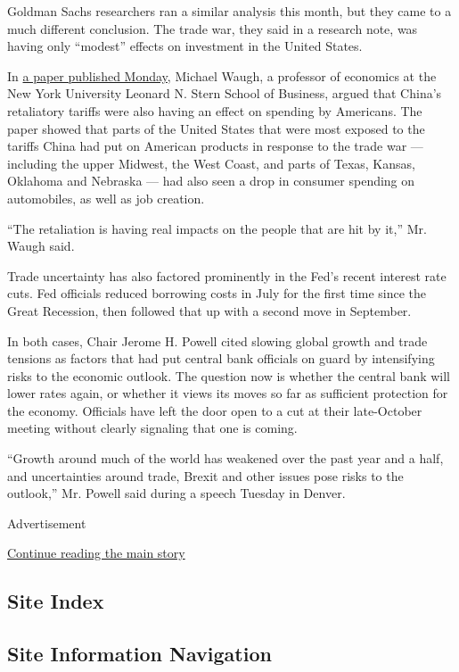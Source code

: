 Goldman Sachs researchers ran a similar analysis this month, but they
came to a much different conclusion. The trade war, they said in a
research note, was having only ``modest'' effects on investment in the
United States.

In \href{https://www.nber.org/papers/w26353}{a paper published Monday},
Michael Waugh, a professor of economics at the New York University
Leonard N. Stern School of Business, argued that China's retaliatory
tariffs were also having an effect on spending by Americans. The paper
showed that parts of the United States that were most exposed to the
tariffs China had put on American products in response to the trade war
--- including the upper Midwest, the West Coast, and parts of Texas,
Kansas, Oklahoma and Nebraska --- had also seen a drop in consumer
spending on automobiles, as well as job creation.

``The retaliation is having real impacts on the people that are hit by
it,'' Mr. Waugh said.

Trade uncertainty has also factored prominently in the Fed's recent
interest rate cuts. Fed officials reduced borrowing costs in July for
the first time since the Great Recession, then followed that up with a
second move in September.

In both cases, Chair Jerome H. Powell cited slowing global growth and
trade tensions as factors that had put central bank officials on guard
by intensifying risks to the economic outlook. The question now is
whether the central bank will lower rates again, or whether it views its
moves so far as sufficient protection for the economy. Officials have
left the door open to a cut at their late-October meeting without
clearly signaling that one is coming.

``Growth around much of the world has weakened over the past year and a
half, and uncertainties around trade, Brexit and other issues pose risks
to the outlook,'' Mr. Powell said during a speech Tuesday in Denver.

Advertisement

\protect\hyperlink{after-bottom}{Continue reading the main story}

\hypertarget{site-index}{%
\subsection{Site Index}\label{site-index}}

\hypertarget{site-information-navigation}{%
\subsection{Site Information
Navigation}\label{site-information-navigation}}

